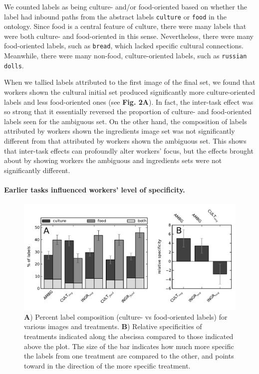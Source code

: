 \documentclass[a4paper]{report}
\begin{document}
We counted labels as being culture- and/or food-oriented based on 
whether the label had inbound paths from the abstract labels \texttt{culture} 
or \texttt{food} in the ontology. Since food is a central feature 
of culture, there were many labels that were both culture- and food-oriented 
in this sense.  Nevertheless, there were many food-oriented labels, such as 
\texttt{bread}, which lacked specific cultural connections.  Meanwhile, there 
were many non-food, culture-oriented labels, such as \texttt{russian dolls}. 

When we tallied labels attributed to the first image of the final set, 
we found that workers shown the cultural initial set produced significantly 
more culture-oriented labels and less food-oriented ones 
(see \textbf{Fig. 2A}).  In fact, the inter-task
effect was so strong that it essentially reversed the proportion of culture- 
and food-oriented labels seen for the ambiguous set.  On the other hand, the 
composition of labels attributed by 
workers shown the ingredients image set was not significantly different from 
that attributed by workers shown the ambiguous set.  This shows that inter-task
effects can profoundly alter workers' focus, but the effects brought 
about by showing workers the ambiguous and ingredients sets were not 
significantly different.



\paragraph{Earlier tasks influenced workers' level of specificity.} 
\begin{figure}
	\begin{center}
		\includegraphics[scale=0.70]{figs/orientation_specificity.pdf}
	\caption{\footnotesize{
		\textbf{A}) Percent label composition (culture- vs food-oriented 
		labels) for 
		various images and treatments.  
		\textbf{B}) Relative specificities of treatments
		indicated along the abscissa compared to those indicated above the 
		plot.  The size of the bar indicates how much more specific
		the labels from one treatment are compared to the other, and points 
		toward in the direction of the more specific treatment.
	}}
	\end{center}
\end{figure}
\end{document}
